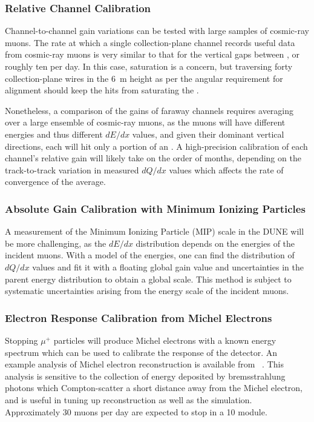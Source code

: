 \subsubsection{Relative Channel Calibration}

Channel-to-channel gain variations can be tested with large samples of cosmic-ray muons.  The rate at
which a single collection-plane channel records useful data from cosmic-ray muons is very similar to that
for the vertical gaps between , or roughly ten per day.  In this case,  saturation is a concern,
but traversing forty collection-plane wires in the \SI{6}{\m} height as per the angular requirement for alignment
should keep the hits from saturating the .

Nonetheless, a comparison of the gains of faraway channels requires averaging over a large ensemble
of cosmic-ray muons, as the muons will have different energies and thus different $dE/dx$ values,
and given their dominant vertical directions, each will hit only a portion of an .  A high-precision
calibration of each channel's relative gain will likely take on the order of months, depending
on the track-to-track variation in measured $dQ/dx$ values which affects the rate of convergence
of the average.

\subsubsection{Absolute Gain Calibration with Minimum Ionizing Particles}

A measurement of the Minimum Ionizing Particle (MIP) scale in the DUNE  will be more challenging, as the $dE/dx$
distribution depends on the energies of the incident muons.  With a model of the energies,
one can find the distribution of $dQ/dx$ values and fit it with a floating global gain value
and uncertainties in the parent energy distribution to obtain a global scale. This method
is subject to systematic uncertainties arising from the energy scale of the incident muons.

\subsubsection{Electron Response Calibration from Michel Electrons}

Stopping $\mu^+$ particles will produce Michel electrons with a known energy spectrum which can
be used to calibrate the response of the detector.  An example analysis of Michel electron
reconstruction is available from \microboone~\cite{Acciarri:2017sjy}.  This analysis is sensitive
to the collection of energy deposited by bremsstrahlung photons which Compton-scatter a short distance away from
the Michel electron, and is useful in tuning up reconstruction as well as the simulation.  Approximately
\num{30} muons per day are expected to stop in a \SI{10}{\kt} module.

